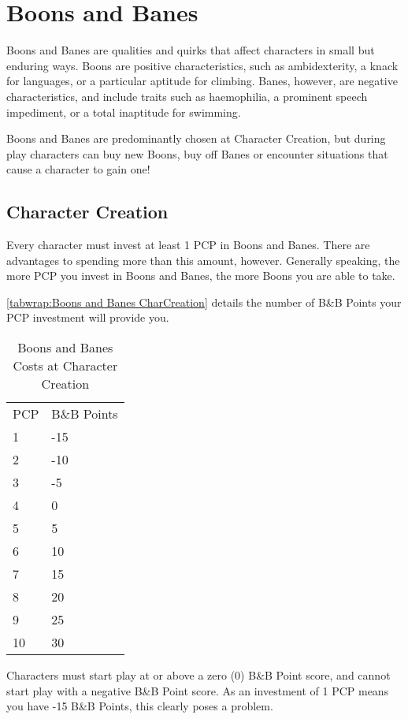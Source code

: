 \documentclass[oneside,11pt,english]{book}
\begin{document}
\chapter{Boons and Banes}\label{ch:boons}
\startcontents[chapters]
\clearpage
Boons and Banes are qualities and quirks that affect characters in small but enduring ways. Boons are 
positive characteristics, such as ambidexterity, a knack for languages, or a particular aptitude for 
climbing. Banes, however, are negative characteristics, and include traits such as haemophilia, a prominent speech impediment, or a total inaptitude for swimming. 


Boons and Banes are predominantly chosen at Character Creation, but during play characters can buy new 
Boons, buy off Banes or encounter situations that cause a character to gain one! 
\section{Character Creation}
Every character must invest at least 1 PCP in Boons and Banes. There are advantages to spending more 
than this amount, however. Generally speaking, the more PCP you invest in Boons and Banes, the more 
Boons you are able to take. 


\autoref{tabwrap:Boons and Banes CharCreation} details the number of B\&B Points your PCP investment will provide you. 


\begin{wraptable}{r}{5cm}
	\caption{Boons and Banes Costs at Character Creation}
	\label{tabwrap:Boons and Banes CharCreation}
	\begin{tabu}{X[c]X[c]}
		PCP&B\&B Points\\
		1&-15\\
		2&-10\\
		3&-5\\
		4&0\\
		5&5\\
		6&10\\
		7&15\\
		8&20\\
		9&25\\
		10&30\\
	\end{tabu}
\end{wraptable}
Characters must start play at or above a zero (0) B\&B Point score, and cannot start play with a negative 
B\&B Point score. As an investment of 1 PCP means you have -15 B\&B Points, this clearly poses a 
problem. 
\end{document}
